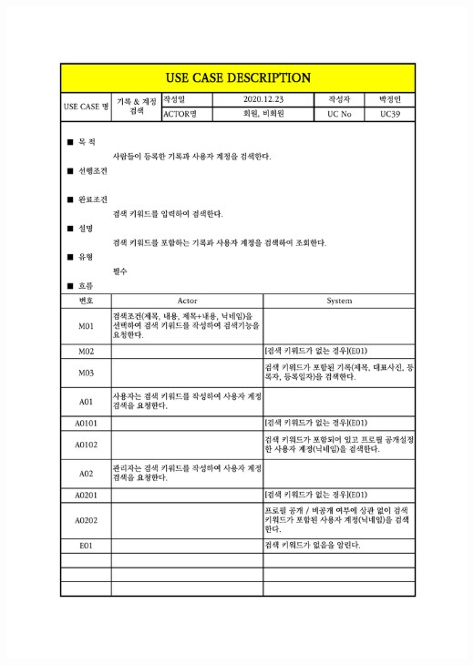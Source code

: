 {{{{{{{{{{{{{{{{{{{{{{{{{{{{{{{{{{{{{{{{{{\includegraphics[width=1.1\textwidth]{./Figure/Design/Display/usecase/039.pdf} \\
}}}}}}}}}}}}}}}}}}}}}}}}}}}}}}}}}}}}}}}}}}

